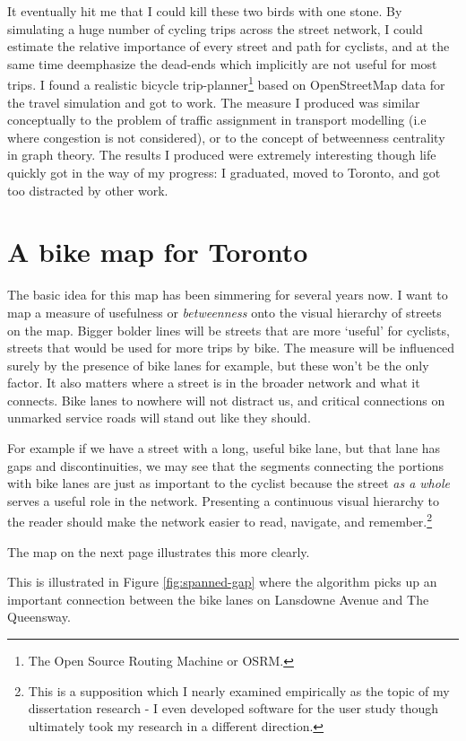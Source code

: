 \documentclass{article}
\begin{document}
		It eventually hit me that I could kill these two birds with one stone. By simulating a huge number of cycling trips across the street network, I could estimate the relative importance of every street and path for cyclists, and at the same time deemphasize the dead-ends which implicitly are not useful for most trips.
		I found a realistic bicycle trip-planner\footnote{The Open Source Routing Machine or OSRM.} based on OpenStreetMap data for the travel simulation and got to work. 
		The measure I produced was similar conceptually to the problem of traffic assignment in transport modelling (i.e where congestion is not considered), or to the concept of betweenness centrality in graph theory.
		The results I produced were extremely interesting though life quickly got in the way of my progress: I graduated, moved to Toronto, and got too distracted by other work.
		
	\section*{A bike map for Toronto}
		The basic idea for this map has been simmering for several years now. I want to map a measure of usefulness or \textit{betweenness} onto the visual hierarchy of streets on the map. Bigger bolder lines will be streets that are more `useful' for cyclists, streets that would be used for more trips by bike. The measure will be influenced surely by the presence of bike lanes for example, but these won't be the only factor. It also matters where a street is in the broader network and what it connects. Bike lanes to nowhere will not distract us, and critical connections on unmarked service roads will stand out like they should. 
		
		For example if we have a street with a long, useful bike lane, but that lane has gaps and discontinuities, we may see that the segments connecting the portions with bike lanes are just as important to the cyclist because the street \textit{as a whole} serves a useful role in the network. 
		Presenting a continuous visual hierarchy to the reader should make the network easier to read, navigate, and remember.\footnote{
			This is a supposition which I nearly examined empirically as the topic of my dissertation research - I even developed software for the user study though ultimately took my research in a different direction.
		} 
		
		The map on the next page illustrates this more clearly. 
		
		This is illustrated in Figure \ref{fig:spanned-gap} where the algorithm picks up an important connection between the bike lanes on Lansdowne Avenue and The Queensway. 
		
\end{document}
